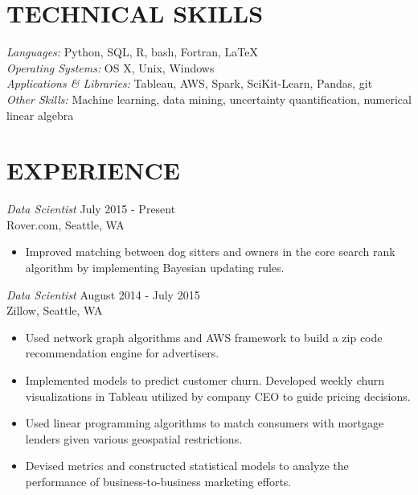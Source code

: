 \documentclass[margin, 10pt]{res} %
\begin{document}
\begin{resume}


\section{TECHNICAL SKILLS} 

{\sl Languages:} Python, SQL, R, bash, Fortran, \LaTeX \\
{\sl Operating Systems:} OS X, Unix, Windows \\
{\sl Applications \& Libraries:} Tableau, AWS, Spark, SciKit-Learn, Pandas, git  \\
{\sl Other Skills:} Machine learning, data mining, uncertainty quantification, numerical linear algebra

 
\section{EXPERIENCE}

{\sl Data Scientist} \hfill July 2015 - Present\\
Rover.com, Seattle, WA

\begin{itemize} \itemsep -2pt %
\item Improved matching between dog sitters and owners in the core search rank algorithm by implementing Bayesian updating rules.
\end{itemize}

{\sl Data Scientist} \hfill August 2014 - July 2015\\
Zillow, Seattle, WA

\begin{itemize} \itemsep -2pt %
\item Used network graph algorithms and AWS framework to build a zip code recommendation engine for advertisers.  
\item Implemented models to predict customer churn. Developed weekly churn visualizations in Tableau utilized by company CEO to guide pricing decisions. 
\item Used linear programming algorithms to match consumers with mortgage lenders given various geospatial restrictions.
\item Devised metrics and constructed statistical models to analyze the performance of business-to-business marketing efforts.  
\end{itemize}


\end{resume}
\end{document}
